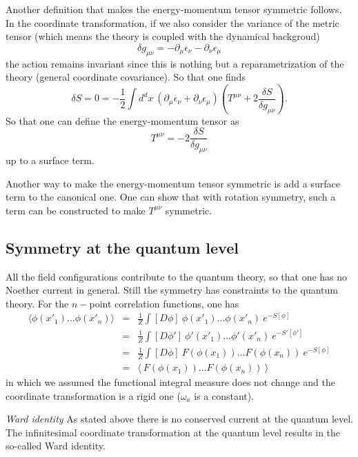 \documentclass[submission, PhysLectNotes]{SciPost}
\begin{document}
Another definition that makes the energy-momentum tensor symmetric follows. In the coordinate transformation, if we also consider the variance of the metric tensor (which means the theory is coupled with the dynamical backgroud)
\begin{equation}
\delta g_{\mu\nu} = -\partial_\mu\epsilon_\nu -\partial_\nu\epsilon_\mu
\end{equation}
the action remains invariant since this is nothing but a reparametrization of the theory (general coordinate covariance). So that one finds
\begin{equation}
    \delta S = 0 = -\frac{1}{2} \int d^dx \ \left(\partial_\mu\epsilon_\nu + \partial_\nu\epsilon_\mu\right) \left(T^{\mu\nu} +2\frac{\delta S}{\delta g_{\mu\nu}}\right).
\end{equation}
So that one can define the energy-momentum tensor as
\begin{equation}
    T^{\mu\nu} = -2\frac{\delta S}{\delta g_{\mu\nu}}
\end{equation}
up to a surface term.

Another way to make the energy-momentum tensor symmetric is add a surface term to the canonical one. One can show that with rotation symmetry, such a term can be constructed to make $T^{\mu\nu}$ symmetric.

\subsection{Symmetry at the quantum level}
All the field configurations contribute to the quantum theory, so that one has no Noether current in general. Still the symmetry has constraints to the quantum theory. For the $n-$point correlation functions, one has
\begin{eqnarray}
\langle \phi(x'_1)...\phi(x'_n) \rangle &=& \frac{1}{Z}\int [D\phi]\ \phi(x'_1)...\phi(x'_n) \ e^{-S[\phi]} \\
&=& \frac{1}{Z}\int [D\phi']\ \phi'(x'_1)...\phi'(x'_n) \ e^{-S'[\phi']} \\
&=& \frac{1}{Z}\int [D\phi]\ F(\phi(x_1))...F(\phi(x_n)) \ e^{-S[\phi]} \\
&=& \langle\ F(\phi(x_1))...F(\phi(x_n)) \ \rangle
\end{eqnarray}
in which we assumed the functional integral measure does not change and the coordinate transformation is a rigid one ($\omega_a$ is a constant).

{\it Ward identity}
As stated above there is no conserved current at the quantum level. The infinitesimal coordinate transformation at the quantum level results in the so-called Ward identity.
\end{document}
